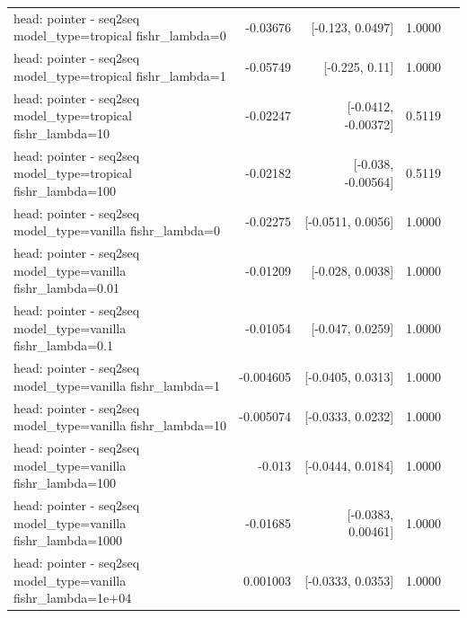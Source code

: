 \documentclass[10pt]{article}
\makeatletter
\newcommand{\stackcell}[1]{\begin{tabular}[t]{@{}l@{}}#1\end{tabular}}
\makeatother
\begin{document}
{\begin{longtable}{lrrrl}
\stackcell{head: pointer - seq2seq\\\footnotesize model\_type=tropical fishr\_lambda=0 } & -0.03676 & [-0.123, 0.0497] & 1.0000 & \\
\stackcell{head: pointer - seq2seq\\\footnotesize model\_type=tropical fishr\_lambda=1 } & -0.05749 & [-0.225, 0.11] & 1.0000 & \\
\stackcell{head: pointer - seq2seq\\\footnotesize model\_type=tropical fishr\_lambda=10 } & -0.02247 & [-0.0412, -0.00372] & 0.5119 & \\
\stackcell{head: pointer - seq2seq\\\footnotesize model\_type=tropical fishr\_lambda=100 } & -0.02182 & [-0.038, -0.00564] & 0.5119 & \\
\stackcell{head: pointer - seq2seq\\\footnotesize model\_type=vanilla fishr\_lambda=0 } & -0.02275 & [-0.0511, 0.0056] & 1.0000 & \\
\stackcell{head: pointer - seq2seq\\\footnotesize model\_type=vanilla fishr\_lambda=0.01 } & -0.01209 & [-0.028, 0.0038] & 1.0000 & \\
\stackcell{head: pointer - seq2seq\\\footnotesize model\_type=vanilla fishr\_lambda=0.1 } & -0.01054 & [-0.047, 0.0259] & 1.0000 & \\
\stackcell{head: pointer - seq2seq\\\footnotesize model\_type=vanilla fishr\_lambda=1 } & -0.004605 & [-0.0405, 0.0313] & 1.0000 & \\
\stackcell{head: pointer - seq2seq\\\footnotesize model\_type=vanilla fishr\_lambda=10 } & -0.005074 & [-0.0333, 0.0232] & 1.0000 & \\
\stackcell{head: pointer - seq2seq\\\footnotesize model\_type=vanilla fishr\_lambda=100 } & -0.013 & [-0.0444, 0.0184] & 1.0000 & \\
\stackcell{head: pointer - seq2seq\\\footnotesize model\_type=vanilla fishr\_lambda=1000 } & -0.01685 & [-0.0383, 0.00461] & 1.0000 & \\
\stackcell{head: pointer - seq2seq\\\footnotesize model\_type=vanilla fishr\_lambda=1e+04 } & 0.001003 & [-0.0333, 0.0353] & 1.0000 & \\
\bottomrule
\end{longtable}
}
\end{document}
